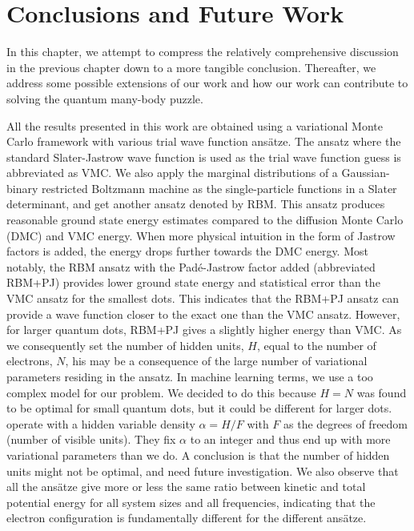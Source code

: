 \chapter{Conclusions and Future Work} \label{sec:conclusion}
In this chapter, we attempt to compress the relatively comprehensive discussion in the previous chapter down to a more tangible conclusion. Thereafter, we address some possible extensions of our work and how our work can contribute to solving the quantum many-body puzzle. 

All the results presented in this work are obtained using a variational Monte Carlo framework with various trial wave function ansätze. The ansatz where the standard Slater-Jastrow wave function is used as the trial wave function guess is abbreviated as VMC. We also apply the marginal distributions of a Gaussian-binary restricted Boltzmann machine as the single-particle functions in a Slater determinant, and get another ansatz denoted by RBM. This ansatz produces reasonable ground state energy estimates compared to the diffusion Monte Carlo (DMC) and VMC energy. When more physical intuition in the form of Jastrow factors is added, the energy drops further towards the DMC energy. Most notably, the RBM ansatz with the Padé-Jastrow factor added (abbreviated RBM+PJ) provides lower ground state energy and statistical error than the VMC ansatz for the smallest dots. This indicates that the RBM+PJ ansatz can provide a wave function closer to the exact one than the VMC ansatz. However, for larger quantum dots, RBM+PJ gives a slightly higher energy than VMC. As we consequently set the number of hidden units, $H$, equal to the number of electrons, $N$, his may be a consequence of the large number of variational parameters residing in the ansatz. In machine learning terms, we use a too complex model for our problem. We decided to do this because $H=N$ was found to be optimal for small quantum dots\supercite{flugsrud_vilde_moe_solving_nodate}, but it could be different for larger dots. \citet{carleo_solving_2017} operate with a hidden variable density $\alpha=H/F$ with $F$ as the degrees of freedom (number of visible units). They fix $\alpha$ to an integer and thus end up with more variational parameters than we do. A conclusion is that the number of hidden units might not be optimal, and need future investigation. We also observe that all the ansätze give more or less the same ratio between kinetic and total potential energy for all system sizes and all frequencies, indicating that the electron configuration is fundamentally different for the different ansätze.

